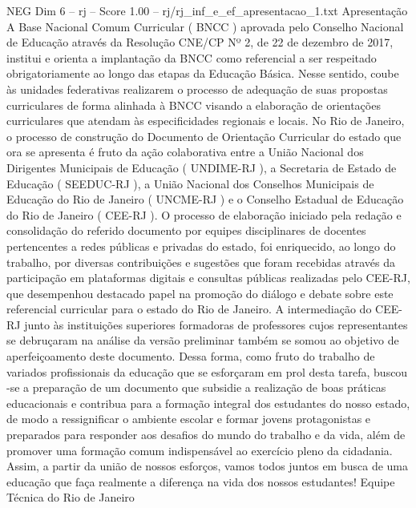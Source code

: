 \begin{textsample}{NEG Dim 6 – rj – Score 1.00 – rj/rj\_inf\_e\_ef\_apresentacao\_1.txt}  \label{ex:f6_neg_017}
Apresentação A Base Nacional Comum Curricular ( BNCC ) aprovada pelo Conselho Nacional de Educação através da Resolução CNE/CP Nº 2, de 22 de dezembro de 2017, institui e orienta a implantação da BNCC como referencial a ser respeitado obrigatoriamente ao longo das etapas da Educação Básica.
Nesse sentido, coube às unidades federativas realizarem o processo de adequação de suas propostas curriculares de forma alinhada à BNCC visando a elaboração de orientações curriculares que atendam às especificidades regionais e locais.
No Rio de Janeiro, o processo de construção do Documento de Orientação Curricular do estado que ora se apresenta é fruto da ação colaborativa entre a União Nacional dos Dirigentes Municipais de Educação ( UNDIME-RJ ), a Secretaria de Estado de Educação ( SEEDUC-RJ ), a União Nacional dos Conselhos Municipais de Educação do Rio de Janeiro ( UNCME-RJ ) e o Conselho Estadual de Educação do Rio de Janeiro ( CEE-RJ ).
O processo de elaboração iniciado pela redação e consolidação do referido documento por equipes disciplinares de docentes pertencentes a redes públicas e privadas do estado, foi enriquecido, ao longo do trabalho, por diversas contribuições e sugestões que foram recebidas através da participação em plataformas digitais e consultas públicas realizadas pelo CEE-RJ, que desempenhou destacado papel na promoção do diálogo e debate sobre este referencial curricular para o estado do Rio de Janeiro.
A intermediação do CEE-RJ junto às instituições superiores formadoras de professores cujos representantes se debruçaram na análise da versão preliminar também se somou ao objetivo de aperfeiçoamento deste documento.
Dessa forma, como fruto do trabalho de variados profissionais da educação que se esforçaram em prol desta tarefa, buscou -se a preparação de um documento que subsidie a realização de boas práticas educacionais e contribua para a formação integral dos estudantes do nosso estado, de modo a ressignificar o ambiente escolar e formar jovens protagonistas e preparados para responder aos desafios do mundo do trabalho e da vida, além de promover uma formação comum indispensável ao exercício pleno da cidadania.
Assim, a partir da união de nossos esforços, vamos todos juntos em busca de uma educação que faça realmente a diferença na vida dos nossos estudantes!
Equipe Técnica do Rio de Janeiro

\end{textsample}
